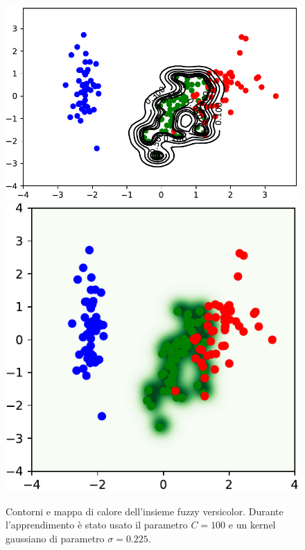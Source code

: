 \documentclass [11pt,a4paper,twoside,openright] {book}
\begin{document}
\begin{figure}[!b]
        \centering%
        \subfigure
          {\includegraphics[scale=.5]{figure/versicolormap.pdf}}\qquad\qquad
       \subfigure
          {\includegraphics[scale=.5]{figure/versicolorheat.pdf}}
          \caption{Contorni e mappa di calore dell'insieme fuzzy versicolor. Durante l'apprendimento è stato usato il parametro $C=100$ e un kernel gaussiano di parametro $\sigma=0.225$.\label{fuzzyversicolor}}
\end{figure}
\end{document}
